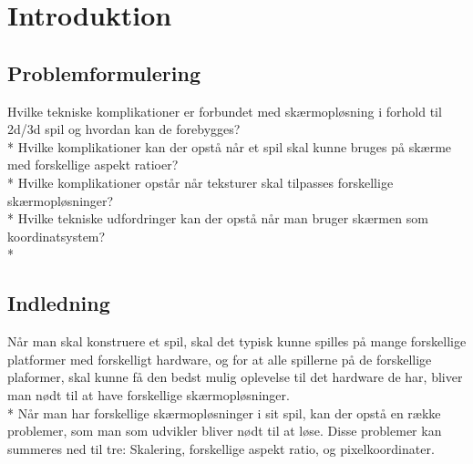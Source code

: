 \documentclass[Main.tex]{introduktion}
\begin{document}
\chapter{Introduktion}

			
\section{Problemformulering}
Hvilke tekniske komplikationer er forbundet med skærmopløsning i forhold til 2d/3d spil og hvordan kan de forebygges?\\*
Hvilke komplikationer kan der opstå når et spil skal kunne bruges på skærme med forskellige aspekt ratioer?\\*
Hvilke komplikationer opstår når teksturer skal tilpasses forskellige skærmopløsninger?\\*
Hvilke tekniske udfordringer kan der opstå når man bruger skærmen som koordinatsystem?\\*
		
\section{Indledning}

Når man skal konstruere et spil, skal det typisk kunne spilles på mange forskellige platformer med forskelligt hardware, og for at alle spillerne på de forskellige plaformer, skal kunne få den bedst mulig oplevelse til det hardware de har, bliver man nødt til at have forskellige skærmopløsninger.\\* 
Når man har forskellige skærmopløsninger i sit spil, kan der opstå en række problemer, som man som udvikler bliver nødt til at løse. Disse problemer kan summeres ned til tre: Skalering, forskellige aspekt ratio, og pixelkoordinater.		
	
\end{document}
